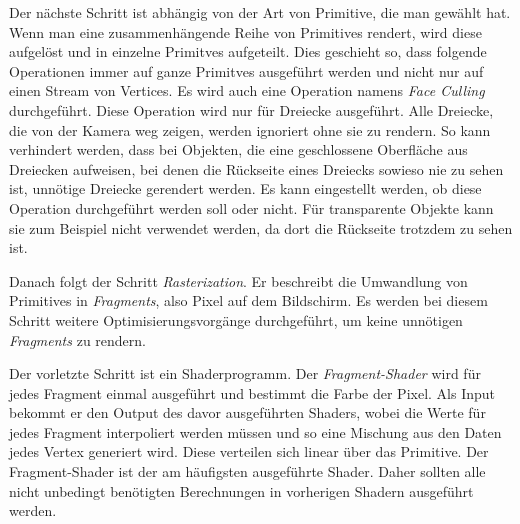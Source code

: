 Der nächste Schritt ist abhängig von der Art von Primitive, die man gewählt hat. Wenn man eine zusammenhängende Reihe von Primitives rendert, wird diese aufgelöst und in einzelne Primitves aufgeteilt. Dies geschieht so, dass folgende Operationen immer auf ganze Primitves ausgeführt werden und nicht nur auf einen Stream von Vertices. 
Es wird auch eine Operation namens \textit{Face Culling} durchgeführt. Diese Operation wird nur für Dreiecke ausgeführt. Alle Dreiecke, die von der Kamera weg zeigen, werden ignoriert ohne sie zu rendern. 
So kann verhindert werden, dass bei Objekten, die eine geschlossene Oberfläche aus Dreiecken aufweisen, bei denen die Rückseite eines Dreiecks sowieso nie zu sehen ist, unnötige Dreiecke gerendert werden. Es kann eingestellt werden, ob diese Operation durchgeführt werden soll oder nicht. Für transparente Objekte kann sie zum Beispiel nicht verwendet werden, da dort die Rückseite trotzdem zu sehen ist.

Danach folgt der Schritt \textit{Rasterization}. Er beschreibt die Umwandlung von Primitives in \textit{Fragments}, also Pixel auf dem Bildschirm. Es werden bei diesem Schritt weitere Optimisierungsvorgänge durchgeführt, um keine unnötigen \textit{Fragments} zu rendern.

Der vorletzte Schritt ist ein Shaderprogramm. Der \textit{Fragment-Shader} wird für jedes Fragment einmal ausgeführt und bestimmt die Farbe der Pixel. Als Input bekommt er den Output des davor ausgeführten Shaders, wobei die Werte für jedes Fragment interpoliert werden müssen und so eine Mischung aus den Daten jedes Vertex generiert wird. 
Diese verteilen sich linear über das Primitive. Der Fragment-Shader ist der am häufigsten ausgeführte Shader. Daher sollten alle nicht unbedingt benötigten Berechnungen in vorherigen Shadern ausgeführt werden.

